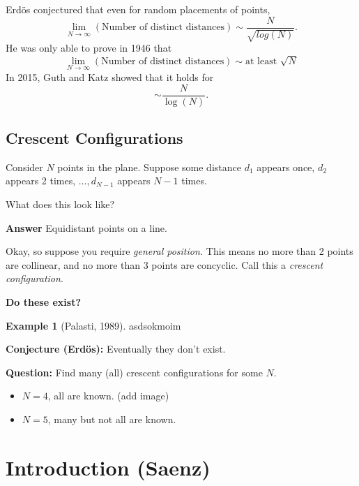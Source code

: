 \documentclass[a5paper]{article}
\theoremstyle{definition}%
\newtheorem*{example*}{Example}
\numberwithin{exercise}{section}
\theoremstyle{remark}%
\begin{document}
Erd\"os conjectured that even for random placements of points, 
$$\lim_{N\to\infty}(\text{Number of distinct distances})\sim \frac{N}{\sqrt{log(N)}}.$$
He was only able to prove in 1946 that 
$$\lim_{N\to\infty}(\text{Number of distinct distances})\sim \text{at least }\sqrt{N}$$
In 2015, Guth and Katz showed that it holds for 
$$\sim\frac{N}{\log(N)}.$$

\subsection{Crescent Configurations}

Consider $N$ points in the plane. Suppose some distance $d_1$ appears once, $d_2$ appears 2 times, $\ldots, d_{N-1}$ appears $N-1$ times. 

What does this look like? 

\textbf{Answer} Equidistant points on a line. 

Okay, so suppose you require \emph{general position.} This means no more than 2 points are collinear, and no more than 3 points are concyclic. Call this a \emph{crescent configuration}. 

\textbf{Do these exist?}

\begin{example*}[Palasti, 1989]
asdsokmoim
\end{example*}

\textbf{Conjecture (Erd\"os):} Eventually they don't exist. 

\textbf{Question:} Find many (all) crescent configurations for some $N$. 
\begin{itemize}
\item $N=4$, all are known. (add image)
\item $N=5$, many but not all are known. 
\end{itemize}

\section{Introduction (Saenz)}
\end{document}
